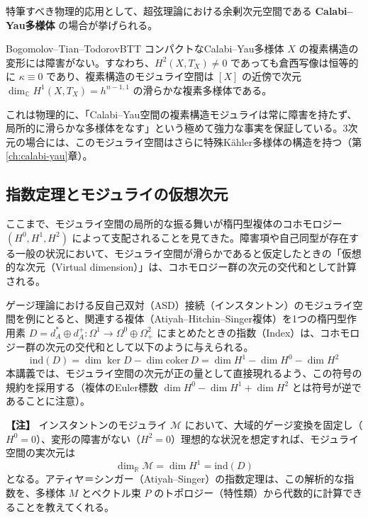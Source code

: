 \documentclass[uplatex, dvipdfmx, book]{jsbook}
\let\origsubsection\subsection
\let\origsubsubsection\subsubsection
\renewcommand{\section}{\origsubsection}
\renewcommand{\subsection}{\origsubsubsection}
\renewcommand{\subsubsection}{\paragraph}
\newenvironment{note}{\vspace{1ex}\par\footnotesize\noindent\textbf{【注】}}{\par\vspace{1ex}}
\begin{document}
特筆すべき物理的応用として、超弦理論における余剰次元空間である \textbf{Calabi--Yau多様体} の場合が挙げられる\cite{tian1987,todorov1989}。

\begin{mythm}{Bogomolov--Tian--Todorov}{BTT}
コンパクトなCalabi--Yau多様体 $X$ の複素構造の変形には障害がない。すなわち、$H^2(X, T_X) \neq 0$ であっても倉西写像は恒等的に $\kappa \equiv 0$ であり、複素構造のモジュライ空間は $[X]$ の近傍で次元 $\dim_{\mathbb{C}} H^1(X, T_X) = h^{n-1,1}$ の滑らかな複素多様体である。
\end{mythm}

これは物理的に、「Calabi--Yau空間の複素構造モジュライは常に障害を持たず、局所的に滑らかな多様体をなす」という極めて強力な事実を保証している。3次元の場合には、このモジュライ空間はさらに特殊K\"ahler多様体の構造を持つ（第\ref{ch:calabi-yau}章）。

\section{指数定理とモジュライの仮想次元}

ここまで、モジュライ空間の局所的な振る舞いが楕円型複体のコホモロジー $(H^0, H^1, H^2)$ によって支配されることを見てきた。障害項や自己同型が存在する一般の状況において、モジュライ空間が滑らかであると仮定したときの「仮想的な次元（Virtual dimension）」は、コホモロジー群の次元の交代和として計算される。

ゲージ理論における反自己双対（ASD）接続（インスタントン）のモジュライ空間を例にとると、関連する複体（Atiyah--Hitchin--Singer複体）を1つの楕円型作用素 $D = d_A^* \oplus d_A^+ : \Omega^1 \to \Omega^0 \oplus \Omega^2_+$ にまとめたときの指数（Index）は、コホモロジー群の次元の交代和として以下のように与えられる。
\begin{equation}
    \mathrm{ind}(D) = \dim \ker D - \dim \mathrm{coker}\, D = \dim H^1 - \dim H^0 - \dim H^2
\end{equation}
本講義では、モジュライ空間の次元が正の量として直接現れるよう、この符号の規約を採用する（複体のEuler標数 $\dim H^0 - \dim H^1 + \dim H^2$ とは符号が逆であることに注意）。

\begin{note}
インスタントンのモジュライ $\mathcal{M}$ において、大域的ゲージ変換を固定し（$H^0=0$）、変形の障害がない（$H^2=0$）理想的な状況を想定すれば、モジュライ空間の実次元は
\begin{equation}
    \dim_{\mathbb{R}} \mathcal{M} = \dim H^1 = \mathrm{ind}(D)
\end{equation}
となる。アティヤ＝シンガー（Atiyah--Singer）の指数定理は、この解析的な指数を、多様体 $M$ とベクトル束 $P$ のトポロジー（特性類）から代数的に計算できることを教えてくれる。
\end{note}
\end{document}
